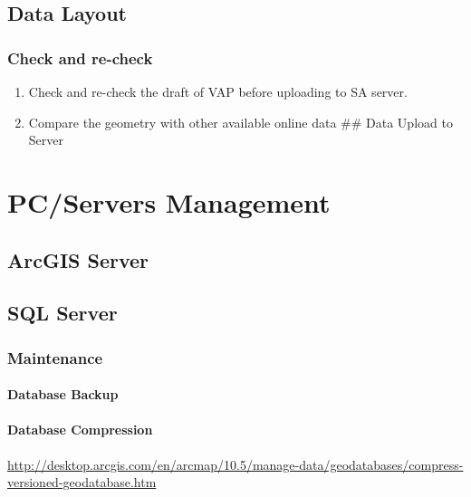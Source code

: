 \documentclass[]{book}
\providecommand{\tightlist}{%
  \setlength{\itemsep}{0pt}\setlength{\parskip}{0pt}}
\begin{document}
\section{Data Layout}\label{data-layout}

\subsection{Check and re-check}\label{check-and-re-check-1}

\begin{enumerate}
\def\labelenumi{\arabic{enumi}.}
\tightlist
\item
  Check and re-check the draft of VAP before uploading to SA server.
\item
  Compare the geometry with other available online data \#\# Data Upload
  to Server
\end{enumerate}

\chapter{PC/Servers Management}\label{pcservers-management}

\section{ArcGIS Server}\label{arcgis-server}

\section{SQL Server}\label{sql-server}

\subsection{Maintenance}\label{maintenance}

\subsubsection{Database Backup}\label{database-backup}

\subsubsection{Database Compression}\label{database-compression}

\url{http://desktop.arcgis.com/en/arcmap/10.5/manage-data/geodatabases/compress-versioned-geodatabase.htm}
\end{document}
